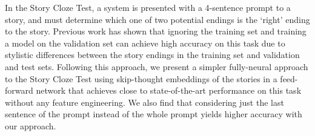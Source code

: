 In the Story Cloze Test, a system is presented with a 4-sentence prompt to a story, and must determine which one of two potential endings is the `right' ending to the story. Previous work has shown that ignoring the training set and training a model on the validation set can achieve high accuracy on this task due to stylistic differences between the story endings in the training set and validation and test sets. Following this approach, we present a simpler fully-neural approach to the Story Cloze Test using skip-thought embeddings of the stories in a feed-forward network that achieves close to state-of-the-art performance on this task without any feature engineering. We also find that considering just the last sentence of the prompt instead of the whole prompt yields higher accuracy with our approach.
